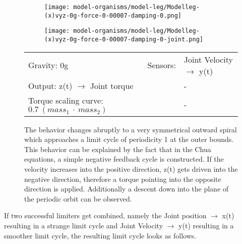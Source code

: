 \documentclass[main]{subfiles}
\begin{document}
\begin{figure}[H]
	\centering
\begin{subfigure}[c]{0.45\textwidth}
	\texttt{[image: model-organisms/model-leg/Modelleg-(x)vyz-0g-force-0-00007-damping-0.png]}
		\end{subfigure}
	\begin{subfigure}[c]{0.45\textwidth}
	\texttt{[image: model-organisms/model-leg/Modelleg-(x)vyz-0g-force-0-00007-damping-0-joint.png]}
		\end{subfigure}
	\caption[Joint Velocity \(\rightarrow\) y(t) limited chaotic controller controlling model leg]{The behavior changes abruptly to a very symmetrical outward spiral which approaches a limit cycle of periodicity 1 at the outer bounds. This behavior can be explained by the fact that in the Chua equations, a simple negative feedback cycle is constructed. If the velocity increases into the positive direction, z(t) gets driven into the negative direction, therefore a torque pointing into the opposite direction is applied. Additionally a descent down into the plane of the periodic orbit can be observed.}
	\begin{tabular}{l|ll}
	\hline 
	Gravity: 0g  & Sensors: & Joint Velocity \(\rightarrow\) y(t)\\
	 Output: z(t) \(\rightarrow\) Joint torque &  & - \\
	  Torque scaling curve: \(0.7~(mass_1~\cdot~mass_2)\) & & - \\
	  \hline
	\end{tabular}

	\label{figure:limited-model-leg4}
\end{figure}

If two successful limiters get combined, namely the Joint position \(\rightarrow\) x(t) resulting in a strange limit cycle and Joint Velocity \(\rightarrow\) y(t) resulting in a smoother limit cycle,  the resulting limit cycle looks as follows.
\end{document}
